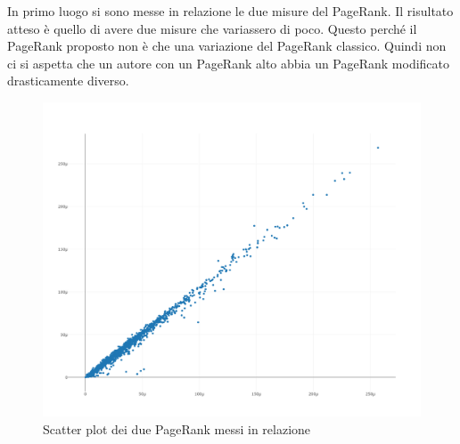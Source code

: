 \documentclass[a4paper, 12pt]{article}
\begin{document}
In primo luogo si sono messe in relazione le due misure del PageRank. Il risultato atteso è quello di avere due misure che variassero di poco. Questo perché il PageRank proposto non è che una variazione del PageRank classico. Quindi non ci si aspetta che un autore con un PageRank alto abbia un PageRank modificato drasticamente diverso.
\begin{figure}[H]
  \includegraphics[width=\linewidth]{images/grafico-1.png}
  \caption{Scatter plot dei due PageRank messi in relazione}
\end{figure}
\end{document}

